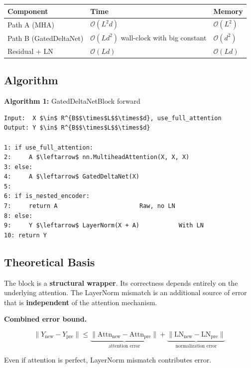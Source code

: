 \begin{table}[H]
\centering
\small
\begin{tabular}{lll}
\toprule
\textbf{Component} & \textbf{Time} & \textbf{Memory} \\
\midrule
Path A (MHA) & $\mathcal{O}(L^2 d)$ & $\mathcal{O}(L^2)$ \\
Path B (GatedDeltaNet) & $\mathcal{O}(L d^2)$ wall-clock with big constant & $\mathcal{O}(d^2)$ \\
Residual + LN & $\mathcal{O}(Ld)$ & $\mathcal{O}(Ld)$ \\
\bottomrule
\end{tabular}
\end{table}

\subsection{Algorithm}

\textbf{Algorithm 1:} GatedDeltaNetBlock forward
\begin{lstlisting}
Input:  X $\in$ R^{B$$\times$L$$\times$d}, use_full_attention
Output: Y $\in$ R^{B$$\times$L$$\times$d}

1: if use_full_attention:
2:     A $\leftarrow$ nn.MultiheadAttention(X, X, X)
3: else:
4:     A $\leftarrow$ GatedDeltaNet(X)
5:
6: if is_nested_encoder:
7:     return A                       Raw, no LN
8: else:
9:     Y $\leftarrow$ LayerNorm(X + A)           With LN
10: return Y
\end{lstlisting}

\subsection{Theoretical Basis}

The block is a \textbf{structural wrapper}. Its correctness depends entirely on 
the underlying attention. The LayerNorm mismatch is an additional source 
of error that is \textbf{independent} of the attention mechanism.

\textbf{Combined error bound.}

\[
\|Y_\text{new} - Y_\text{pre}\| \leq \underbrace{\|\text{Attn}_\text{new} - \text{Attn}_\text{pre}\|}_{\text{attention error}} + \underbrace{\|\text{LN}_\text{new} - \text{LN}_\text{pre}\|}_{\text{normalization error}}
\tag{4.2}
\]

Even if attention is perfect, LayerNorm mismatch contributes error.

